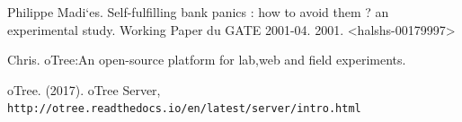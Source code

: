 \begin{thebibliography}{XX}
 Philippe Madi`es. Self-fulfilling bank panics : how to avoid them ? an experimental study.
Working Paper du GATE 2001-04. 2001. <halshs-00179997>

 Chris. oTree:An open-source platform for lab,web and field experiments.

 oTree. (2017). oTree Server,\\ \verb|http://otree.readthedocs.io/en/latest/server/intro.html|




\end{thebibliography}



